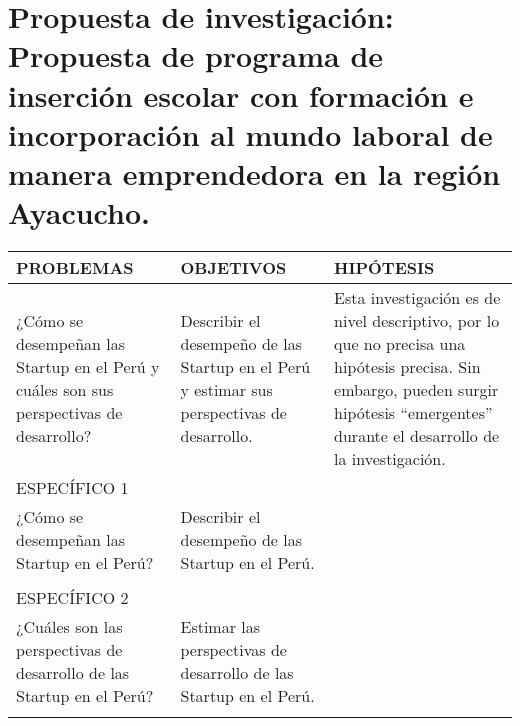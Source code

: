\documentclass[
  man,
  floatsintext,
  longtable,
  a4paper,
  nolmodern,
  notxfonts,
  notimes,
  colorlinks=true,linkcolor=blue,citecolor=blue,urlcolor=blue]{apa7}
\begin{document}
\section{Propuesta de investigación: Propuesta de programa de inserción
escolar con formación e incorporación al mundo laboral de manera
emprendedora en la región
Ayacucho.}\label{propuesta-de-investigaciuxf3n-propuesta-de-programa-de-inserciuxf3n-escolar-con-formaciuxf3n-e-incorporaciuxf3n-al-mundo-laboral-de-manera-emprendedora-en-la-regiuxf3n-ayacucho.}

\begin{longtable}[]{@{}
  >{\raggedright\arraybackslash}p{}
  >{\raggedright\arraybackslash}p{}
  >{\raggedright\arraybackslash}p{}@{}}
\toprule\noalign{}
\begin{minipage}[b]{\linewidth}\raggedright
PROBLEMAS
\end{minipage} & \begin{minipage}[b]{\linewidth}\raggedright
OBJETIVOS
\end{minipage} & \begin{minipage}[b]{\linewidth}\raggedright
HIPÓTESIS
\end{minipage} \\
\midrule\noalign{}
\endhead
\bottomrule\noalign{}
\endlastfoot
¿Cómo se desempeñan las Startup en el Perú y cuáles son sus perspectivas
de desarrollo? & Describir el desempeño de las Startup en el Perú y
estimar sus perspectivas de desarrollo. & Esta investigación es de nivel
descriptivo, por lo que no precisa una hipótesis precisa. Sin embargo,
pueden surgir hipótesis ``emergentes'' durante el desarrollo de la
investigación. \\
ESPECÍFICO 1 & & \\
¿Cómo se desempeñan las Startup en el Perú? & Describir el desempeño de
las Startup en el Perú. & \\
& & \\
ESPECÍFICO 2 & & \\
¿Cuáles son las perspectivas de desarrollo de las Startup en el Perú? &
Estimar las perspectivas de desarrollo de las Startup en el Perú. & \\
& & \\
\end{longtable}
\end{document}
